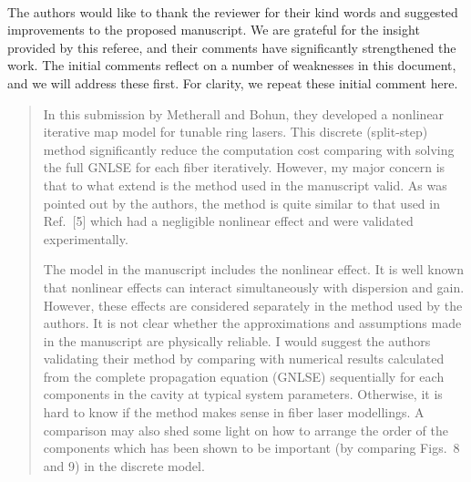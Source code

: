 \documentclass[12pt,twoside,letterpaper]{article}
\begin{document}
\setcounter{mychapter}{1}

\pagestyle{fancy}
\fancyhf{} %
\renewcommand{\footrulewidth}{0pt}
\renewcommand{\headrulewidth}{0.1pt}


~\vspace{\baselineskip}

The authors would like to thank the reviewer for their kind words and suggested improvements to the proposed manuscript. We are grateful for the insight provided by this referee, and their comments have significantly strengthened the work. The initial comments reflect on a number of weaknesses in this document, and we will address these first. For clarity, we repeat these initial comment here.

\begin{quote}
    In this submission by Metherall and Bohun, they developed a nonlinear iterative map model for tunable ring lasers. This discrete (split-step) method significantly reduce the computation cost comparing with solving the full GNLSE for each fiber iteratively. However, my major concern is that to what extend is the method used in the manuscript valid. As was pointed out by the authors, the method is quite similar to that used in Ref.~[5] which had a negligible nonlinear effect and were validated experimentally.

    The model in the manuscript includes the nonlinear effect. It is well known that nonlinear effects can interact simultaneously with dispersion and gain. However, these effects are considered separately in the method used by the authors. It is not clear whether the approximations and assumptions made in the manuscript are physically reliable. I would suggest the authors validating their method by comparing with numerical results calculated from the complete propagation equation (GNLSE) sequentially for each components in the cavity at typical system parameters. Otherwise, it is hard to know if the method makes sense in fiber laser modellings. A comparison may also shed some light on how to arrange the order of the components which has been shown to be important (by comparing Figs.~8 and 9) in the discrete model.
\end{quote}
\end{document}
